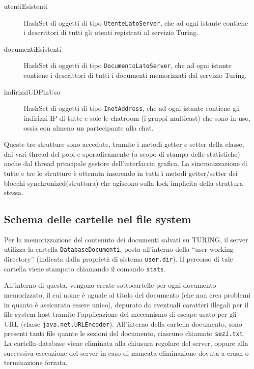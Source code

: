 \documentclass[a4paper,12pt]{article}
\begin{document}
 \begin{description}
  \item[utentiEsistenti] HashSet di oggetti di tipo \texttt{UtenteLatoServer}, che ad ogni istante contiene i descrittori di tutti gli utenti registrati al servizio Turing.
  \item[documentiEsistenti] HashSet di oggetti di tipo \texttt{DocumentoLatoServer}, che ad ogni istante contiene i descrittori di tutti i documenti memorizzati dal servizio Turing.
  \item[indirizziUDPinUso] HashSet di oggetti di tipo \texttt{InetAddress}, che ad ogni istante contiene gli indirizzi IP di tutte e sole le chatroom (i gruppi multicast) che sono in uso, ossia con almeno un partecipante alla chat.
 \end{description}
 
 Queste tre strutture sono accedute, tramite i metodi getter e setter della classe, dai vari thread del pool e sporadicamente (a scopo di stampa delle statistiche) anche dal thread principale gestore dell'interfaccia grafica. La sincronizzazione di tutte e tre le strutture è ottenuta inserendo in tutti i metodi getter/setter dei blocchi synchronized(struttura) che agiscono sulla lock implicita della struttura stessa.
 
 \subsection{ Schema delle cartelle nel file system }
 Per la memorizzazione del contenuto dei documenti salvati su TURING, il server utilizza la cartella \texttt{DatabaseDocumenti}, posta all'interno della ``user working directory'' (indicata dalla proprietà di sistema \texttt{user.dir}). Il percorso di tale cartella viene stampato chiamando il comando \texttt{stats}.
 
 All'interno di questa, vengono create sottocartelle per ogni documento memorizzato, il cui nome è uguale al titolo del documento (che non crea problemi in quanto è assicurato essere unico), depurato da eventuali caratteri illegali per il file system host tramite l'applicazione del meccanismo di escape usato per gli URL (classe \texttt{java.net.URLEncoder}). All'interno della cartella documento, sono presenti tanti file quante le sezioni del documento, ciascuno chiamato \texttt{sez\textit{i}.txt}. La cartella-database viene eliminata alla chiusura regolare del server, oppure alla successiva esecuzione del server in caso di mancata eliminazione dovuta a crash o terminazione forzata.
 
\end{document}
